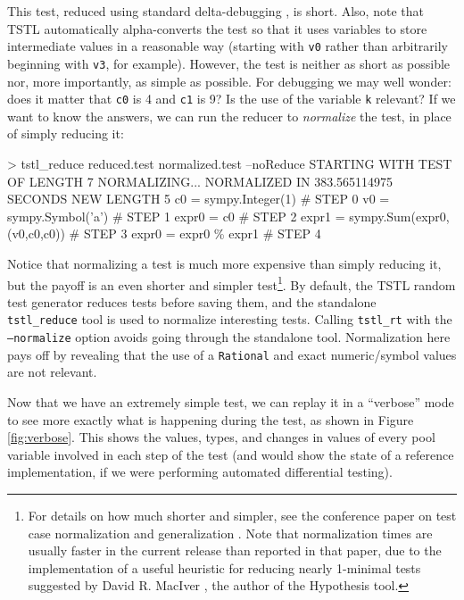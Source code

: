 This test, reduced using standard delta-debugging \cite{DD}, is
short.  Also, note that TSTL automatically alpha-converts the test so
that it uses variables to store intermediate values in a reasonable
way (starting with {\tt v0} rather than arbitrarily beginning with
{\tt v3}, for example).  However, the test is neither as short as possible nor, more
importantly, as simple as possible.  For debugging we may well wonder:
does it matter that {\tt c0} is 4 and {\tt c1} is 9?  Is the use of
the variable {\tt k} relevant?  If we want to know the answers, we can
run the reducer to \emph{normalize} \cite{OneTest} the test, in place
of simply reducing it:

{\scriptsize
\begin{code}
 > tstl\_reduce reduced.test normalized.test --noReduce
 STARTING WITH TEST OF LENGTH 7
 NORMALIZING...
 NORMALIZED IN 383.565114975 SECONDS
 NEW LENGTH 5
 c0 = sympy.Integer(1)                            \# STEP 0
 v0 = sympy.Symbol('a')                           \# STEP 1
 expr0 = c0                                       \# STEP 2
 expr1 = sympy.Sum(expr0,(v0,c0,c0))              \# STEP 3
 expr0 = expr0 \% expr1                            \# STEP 4
\end{code}
}

Notice that normalizing a test is much more expensive than simply
reducing it, but the payoff is an even shorter and simpler
test\footnote{For details on how much shorter and simpler, see the
  conference paper on test case normalization and generalization
  \cite{OneTest}.  Note that normalization times are usually faster in
the current release than reported in that paper, due to the
implementation of a useful heuristic for reducing nearly 1-minimal
tests suggested by David R. MacIver \cite{MacIver}, the author of the Hypothesis tool.}.  By default, the TSTL random test generator
reduces tests before saving them, and the standalone {\tt
  tstl\_reduce} tool is used to normalize interesting tests.  Calling
{\tt tstl\_rt} with the {\tt --normalize} option avoids going through
the standalone tool.  Normalization here pays off by revealing that
the use of a {\tt Rational} and exact numeric/symbol values are not
relevant.  

Now that we have an extremely simple test, we can replay it in a
``verbose'' mode to see more exactly what is happening during the test, as shown in
Figure \ref{fig:verbose}.  This shows the values, types, and changes
in values of every pool variable involved in each step of the test
(and would show the state of a reference implementation, if we were
performing automated differential testing).

